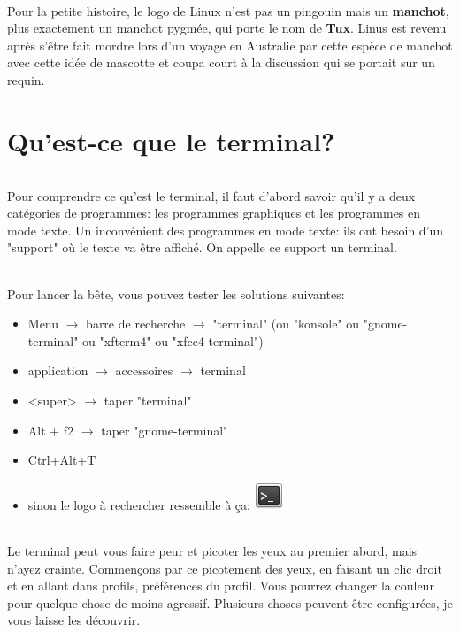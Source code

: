 \documentclass[french, a4paper, 12pt, titlepage]{article}
\begin{document}
\paragraph{}
Pour la petite histoire, le logo de Linux n'est pas un pingouin mais un
\textbf{manchot}, plus exactement un manchot pygmée, qui porte le nom de
\textbf{Tux}. Linus est revenu après s'être fait mordre lors d'un voyage en
Australie par cette espèce de manchot avec cette idée de mascotte et coupa
court à la discussion qui se portait sur un requin.

\newpage
\part{Qu'est-ce que le terminal?}

\paragraph{} Pour comprendre ce qu'est le terminal, il faut d'abord savoir
qu'il y a deux catégories de programmes: les programmes graphiques et les
programmes en mode texte. Un inconvénient des programmes en mode texte: ils ont
besoin d'un "support" où le texte va être affiché. On appelle ce support un
terminal.

\paragraph{} Pour lancer la bête, vous pouvez tester les solutions suivantes:
\begin{itemize}
	\item Menu $\rightarrow$ barre de recherche $\rightarrow$ "terminal" (ou
		"konsole" ou "gnome-terminal" ou "xfterm4" ou "xfce4-terminal")
	\item application $\rightarrow$ accessoires $\rightarrow$ terminal
	\item <super> $\rightarrow$ taper "terminal"
	\item Alt + f2 $\rightarrow$ taper "gnome-terminal"
	\item Ctrl+Alt+T
	\item sinon le logo à rechercher ressemble à ça:
		\includegraphics[scale=0.7]{Images/termIcon}
\end{itemize}

\paragraph{} Le terminal peut vous faire peur et picoter les yeux au premier
abord, mais n'ayez crainte. Commençons par ce picotement des yeux, en faisant
un clic droit et en allant dans profils, préférences du profil. Vous pourrez
changer la couleur pour quelque chose de moins agressif. Plusieurs choses
peuvent être configurées, je vous laisse les découvrir.
\end{document}
